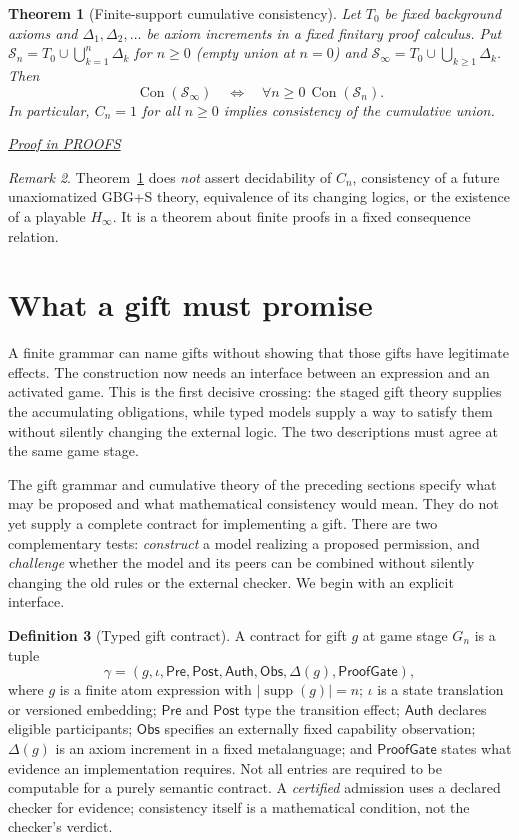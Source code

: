 \documentclass[11pt,letterpaper]{article}
\newtheorem{theorem}{Theorem}[section]
\theoremstyle{definition}\newtheorem{definition}[theorem]{Definition}\newtheorem{example}[theorem]{Example}
\theoremstyle{remark}\newtheorem{remark}[theorem]{Remark}
\newcommand{\Con}{\operatorname{Con}}
\newcommand{\Stage}{\mathcal{S}}
\newcommand{\Supp}{\operatorname{supp}}
\newcommand{\proofat}[1]{\par\smallskip\noindent\hfill\textit{\hyperref[#1]{Proof in PROOFS}}}
\begin{document}
\begin{theorem}[Finite-support cumulative consistency]\label{w0:thm:finite}
Let $T_0$ be fixed background axioms and $\Delta_1,\Delta_2,\ldots$ be axiom increments in a fixed finitary proof calculus. Put $\Stage_n=T_0\cup\bigcup_{k=1}^n\Delta_k$ for $n\ge0$ (empty union at $n=0$) and $\Stage_\infty=T_0\cup\bigcup_{k\ge1}\Delta_k$. Then
\[
\Con(\Stage_\infty)\quad\Longleftrightarrow\quad\forall n\ge0\,\Con(\Stage_n).
\]
In particular, $C_n=1$ for all $n\ge0$ implies consistency of the cumulative union.\proofat{w0:pr:finite}
\end{theorem}
\begin{remark}
Theorem~\ref{w0:thm:finite} does \emph{not} assert decidability of $C_n$, consistency of a future unaxiomatized GBG+S theory, equivalence of its changing logics, or the existence of a playable $H_\infty$. It is a theorem about finite proofs in a fixed consequence relation.
\end{remark}

\section{What a gift must promise}\label{sec:typed-braid}
A finite grammar can name gifts without showing that those gifts have
legitimate effects. The construction now needs an interface between an
expression and an activated game. This is the first decisive crossing:
the staged gift theory supplies the accumulating obligations, while typed
models supply a way to satisfy them without silently changing the external
logic. The two descriptions must agree at the same game stage.

The gift grammar and cumulative theory of the preceding sections specify what may be proposed and what mathematical consistency would mean. They do not yet supply a complete contract for implementing a gift. There are two complementary tests: \emph{construct} a model realizing a proposed permission, and \emph{challenge} whether the model and its peers can be combined without silently changing the old rules or the external checker. We begin with an explicit interface.


\begin{definition}[Typed gift contract]\label{w1:def:contract}
A contract for gift $g$ at game stage $G_n$ is a tuple
\[
 \gamma=(g,\iota,\mathsf{Pre},\mathsf{Post},\mathsf{Auth},\mathsf{Obs},\Delta(g),\mathsf{ProofGate}),
\]
where $g$ is a finite atom expression with $|\Supp(g)|=n$; $\iota$ is a state translation or versioned embedding; $\mathsf{Pre}$ and $\mathsf{Post}$ type the transition effect; $\mathsf{Auth}$ declares eligible participants; $\mathsf{Obs}$ specifies an externally fixed capability observation; $\Delta(g)$ is an axiom increment in a fixed metalanguage; and $\mathsf{ProofGate}$ states what evidence an implementation requires. Not all entries are required to be computable for a purely semantic contract. A \emph{certified} admission uses a declared checker for evidence; consistency itself is a mathematical condition, not the checker's verdict.
\end{definition}
\end{document}
